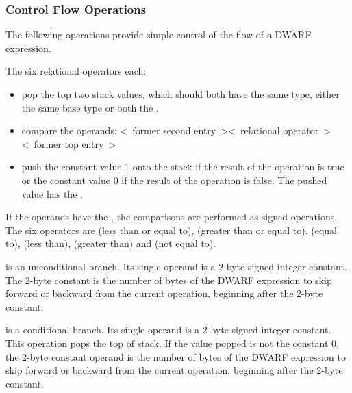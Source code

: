 \subsubsection{Control Flow Operations}
\label{chap:controlflowoperations}
The 
following operations provide simple control of the flow of a DWARF expression.
\begin{enumerate}[1. ]
\itembfnl{\DWOPleTARG, \DWOPgeTARG, \DWOPeqTARG, \DWOPltTARG, \DWOPgtTARG, \DWOPneTARG}
The six relational operators each:
\begin{itemize}
\item pop the top two stack values, which should both have the same type,
either the same base type or both the \specialaddresstype, 

\item compare the operands:
\linebreak
\textless~former second entry~\textgreater  \textless~relational operator~\textgreater \textless~former top entry~\textgreater

\item push the constant value 1 onto the stack 
if the result of the operation is true or the
constant value 0 if the result of the operation is false.
The pushed value has the \specialaddresstype.
\end{itemize}

If the operands have the \specialaddresstype, the comparisons  
are performed as signed operations.
The six operators are \DWOPleNAME{} (less than or equal to), \DWOPgeNAME{}
(greater than or equal to), \DWOPeqNAME{} (equal to), \DWOPltNAME{} (less
than), \DWOPgtNAME{} (greater than) and \DWOPneNAME{} (not equal to).

\itembfnl{\DWOPskipTARG}
\DWOPskipNAME{} is an unconditional branch. Its single operand
is a 2-byte signed integer constant. The 2-byte constant is
the number of bytes of the DWARF expression to skip forward
or backward from the current operation, beginning after the
2-byte constant.

\itembfnl{\DWOPbraTARG}
\DWOPbraNAME{} is a conditional branch. Its single operand is a
2-byte signed integer constant.  This operation pops the
top of stack. If the value popped is not the constant 0,
the 2-byte constant operand is the number of bytes of the
DWARF expression to skip forward or backward from the current
operation, beginning after the 2-byte constant.


\end{enumerate}
